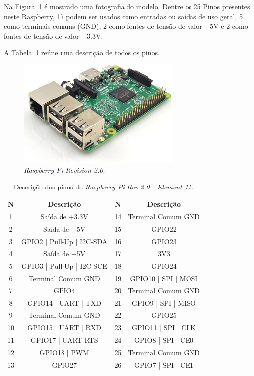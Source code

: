 \documentclass[12pt,a4paper,oneside]{book}
\begin{document}
\pagebreak

Na Figura~\ref{fig:rasp3b.jpg.0} é mostrado uma fotografia do modelo. 
Dentre os 25 Pinos presentes neste Raspberry, 17 podem ser usados como entradas ou saídas de uso geral, 5 como terminais comuns (GND), 2 como fontes de tensão de valor +5V e 2 como fontes de tensão de valor +3.3V. 

%
A Tabela~\ref{tab:Raspberry Pinout} reúne uma descrição de todos os pinos.
%
\begin{figure}[!htbp]
    \centering
    \includegraphics[width=0.7\textwidth]{Images/introducao/rasp3b.jpg}
    \caption{\textit{Raspberry Pi Revision 2.0}.}
    \label{fig:rasp3b.jpg.0}
\end{figure}
%
\begin{table}[!htbp]
    \centering
    \begin{tabular}{|c|c|c|c|} 
         \hline
         \textbf{N} & \textbf{Descrição} & \textbf{N} & \textbf{Descrição} \\ [0.5ex]
         \hline
         1 & Saída de +3.3V & 14 & Terminal Comum GND\\
         \hline
         2 & Saída de +5V & 15 & GPIO22 \\
         \hline
         3 & GPIO2 | Pull-Up | I2C-SDA & 16 & GPIO23 \\ 
         \hline
         4 & Saída de +5V & 17 & 3V3 \\
         \hline
         5 & GPIO3 | Pull-Up | I2C-SCE & 18 & GPIO24 \\
         \hline
         6 & Terminal Comum GND & 19 & GPIO10 | SPI | MOSI \\ 
         \hline
         7 & GPIO4 & 20 & Terminal Comum GND \\ 
         \hline
         8 & GPIO14 | UART | TXD & 21 & GPIO9 | SPI | MISO\\
         \hline
         9 & Terminal Comum GND & 22 & GPIO25\\
         \hline
         10 & GPIO15 | UART | RXD & 23 & GPIO11 | SPI | CLK\\ 
         \hline
         11 & GPIO17 | UART-RTS & 24 & GPIO8 | SPI | CE0\\
         \hline
         12 & GPIO18 | PWM & 25 & Terminal Comum GND\\ 
         \hline
         13 & GPIO27 & 26 & GPIO7 | SPI | CE1\\ 
         \hline
    \end{tabular}
    \caption{Descrição dos pinos do \textit{Raspberry Pi Rev 2.0 - Element 14}.}
    \label{tab:Raspberry Pinout}
\end{table}
\end{document}
